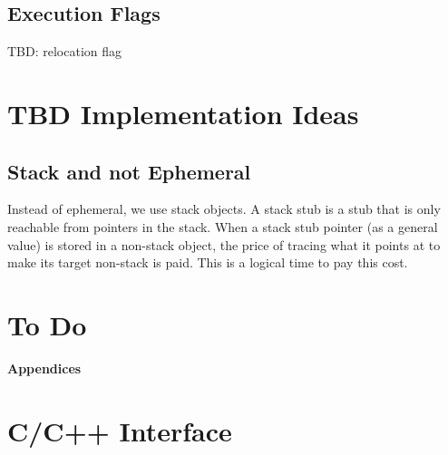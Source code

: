 \documentclass[12pt]{article}
\begin{document}
\subsection{Execution Flags}
\label{EXECUTION-FLAGS}

TBD: relocation flag

\section{TBD Implementation Ideas}


\subsection{Stack and not Ephemeral}

Instead of ephemeral, we use stack objects.  A stack stub is a stub that
is only reachable from pointers in the stack.   When a stack stub
pointer (as a general value) is stored in a non-stack object, the price
of tracing what it points at to make its target non-stack is paid.
This is a logical time to pay this cost.

\section{To Do}

\clearpage

\appendix

\centerline{\Large \bf Appendices}

\section{C/C++ Interface}
\label{C/C++-Interface}
\end{document}
